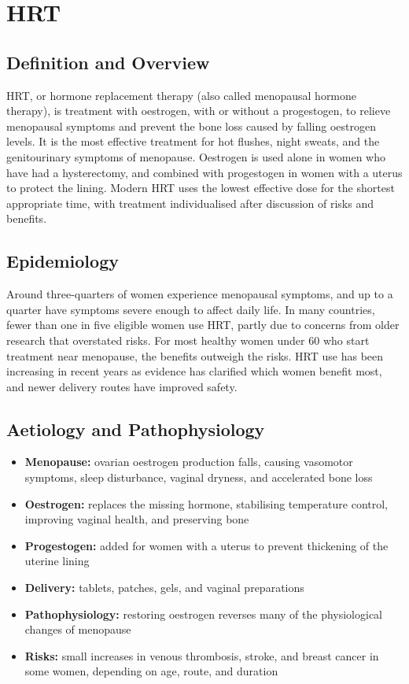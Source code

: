 \chapter{HRT}

\section*{Definition and Overview}
HRT, or hormone replacement therapy (also called menopausal hormone therapy), is treatment with oestrogen, with or without a progestogen, to relieve menopausal symptoms and prevent the bone loss caused by falling oestrogen levels. It is the most effective treatment for hot flushes, night sweats, and the genitourinary symptoms of menopause. Oestrogen is used alone in women who have had a hysterectomy, and combined with progestogen in women with a uterus to protect the lining. Modern HRT uses the lowest effective dose for the shortest appropriate time, with treatment individualised after discussion of risks and benefits.

\section*{Epidemiology}
Around three-quarters of women experience menopausal symptoms, and up to a quarter have symptoms severe enough to affect daily life. In many countries, fewer than one in five eligible women use HRT, partly due to concerns from older research that overstated risks. For most healthy women under 60 who start treatment near menopause, the benefits outweigh the risks. HRT use has been increasing in recent years as evidence has clarified which women benefit most, and newer delivery routes have improved safety.

\section*{Aetiology and Pathophysiology}
\begin{itemize}
    \item \textbf{Menopause:} ovarian oestrogen production falls, causing vasomotor symptoms, sleep disturbance, vaginal dryness, and accelerated bone loss
    \item \textbf{Oestrogen:} replaces the missing hormone, stabilising temperature control, improving vaginal health, and preserving bone
    \item \textbf{Progestogen:} added for women with a uterus to prevent thickening of the uterine lining
    \item \textbf{Delivery:} tablets, patches, gels, and vaginal preparations
    \item \textbf{Pathophysiology:} restoring oestrogen reverses many of the physiological changes of menopause
    \item \textbf{Risks:} small increases in venous thrombosis, stroke, and breast cancer in some women, depending on age, route, and duration
\end{itemize}

